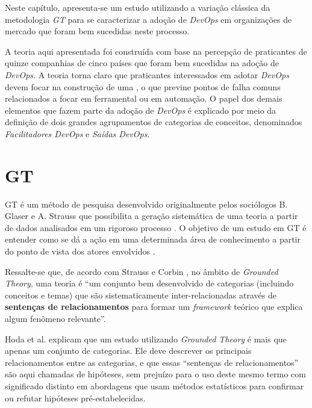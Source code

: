 Neste capítulo, apresenta-se um estudo utilizando a variação clássica da
metodologia \textit{\acrfull{GT}} \cite{glaser1967discovery} para se
caracterizar a adoção de \textit{DevOps} em organizações de mercado que foram bem
sucedidas neste processo.

A teoria aqui apresentada foi construída com base na percepção de
praticantes de quinze companhias de cinco países que foram bem sucedidas na
adoção de \textit{DevOps}. A teoria torna claro que praticantes interessados em
adotar \textit{DevOps} devem focar na construção de uma , o que previne pontos de falha comuns relacionados a focar em
ferramental ou em automação. O papel dos demais elementos que fazem parte da
adoção de \textit{DevOps} é explicado por meio da definição de dois grandes
agrupamentos de categorias de conceitos, denominados \emph{Facilitadores DevOps}
e \emph{Saídas DevOps}.

\section{\acrfull{GT}}

\acrfull{GT} é um método de pesquisa desenvolvido originalmente pelos
sociólogos B. Glaser e A. Strauss que possibilita a geração sistemática de
uma teoria a partir de dados analisados em um rigoroso processo \cite{glaser1967discovery}.
O objetivo de um estudo em \acrshort{GT} é entender como se dá a ação em uma
determinada área de conhecimento a partir do ponto de vista dos atores
envolvidos \cite{glaser_doing_1998}.

Ressalte-se que, de acordo com Strauss e Corbin \cite{corbin2014basics}, no
âmbito de \textit{Grounded Theory}, uma teoria é ``um conjunto bem desenvolvido
de categorias (incluindo conceitos e temas) que são sistematicamente
inter-relacionadas através de \textbf{sentenças de relacionamentos} para
formar um \textit{framework} teórico que explica algum fenômeno relevante''.

Hoda et al. \cite{hoda2017becoming} explicam que um estudo utilizando
\textit{Grounded Theory} é mais que apenas um conjunto de categorias. Ele deve
descrever os principais relacionamentos entre as categorias, e que essas
``sentenças de relacionamentos'' são aqui chamadas de hipóteses, sem prejuízo
para o uso deste mesmo termo com significado distinto em abordagens que usam
métodos estatísticos para confirmar ou refutar hipóteses pré-estabelecidas.

